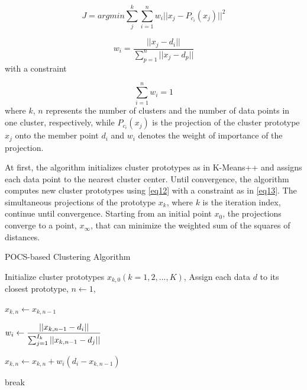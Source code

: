\documentclass[conference]{IEEEtran}
\begin{document}
\begin{equation}
J = argmin \sum_{j}^{k} \sum_{i=1}^{n} w_i || x_j -  P_{c_i}(x_j) ||^2   \label{eq11}
\end{equation}

\begin{equation}
w_i = \frac{|| x_j - d_i ||}{\sum_{p=1}^{n}  || x_j - d_{p} || }   \label{eq9}
\end{equation} with a constraint

\begin{equation}
\sum_{i=1}^{n} w_i = 1  \label{eq10}
\end{equation} where $k$, $n$ represents the number of clusters and the number of data points in one cluster, respectively, while $P_{c_i} (x_j)$ is the projection of the cluster prototype $x_j$ onto the member point $d_i$ and $w_i$ denotes the weight of importance of the projection.

At first, the algorithm initializes cluster prototypes as in K-Means++ \cite{b7} and assigns each data point to the nearest cluster center. Until convergence, the algorithm computes new cluster prototypes using \eqref{eq12} with a constraint as in \eqref{eq13}. The simultaneous  projections of the prototype $x_k$, where $k$ is the iteration index, continue until convergence. Starting from an initial point $x_0$, the projections converge to a point, $x_\infty$, that can minimize the weighted sum of the squares of distances.


\begin{algorithm}[t]
\caption{POCS-based Clustering Algorithm}
\begin{algorithmic}[1]
\State Initialize cluster prototypes $x_{k,0} (k = 1, 2, ..., K)$,
\State Assign each data $d$ to its closest prototype,
\State $n \gets 1$,

    \State $x_{k,n} \gets x_{k,n-1}$
        
            \State $w_i \gets \mathlarger{\frac{|| x_{k,n-1} - d_i ||}{\sum_{j=1}^{I_k}  || x_{k,n-1} - d_j || }}$
            
            \State $x_{k,n} \gets x_{k,n} + w_i(d_i - x_{k,n-1})$
            
        \EndFor
    \EndFor

        \State break     
    \EndIf

\EndWhile
\end{algorithmic}
\end{algorithm}
\end{document}
